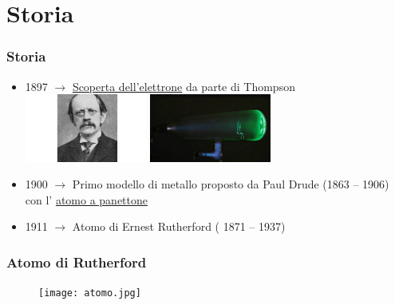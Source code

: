\section{Storia} %
	\label{sec:storia}
	
	\begin{frame}[t]\frametitle{Storia}
		\begin{itemize}
			\item 1897 $\longrightarrow$ \href{http://www.wired.it/scienza/energia/2014/04/30/la-scoperta-dellelettrone/}{Scoperta dell'elettrone} da parte di Thompson 
			\includegraphics[width=4cm]{./img/thompson.jpg}
			\includegraphics[width=4cm]{./img/tubo.jpg}
			\pause
			\item 1900  $\longrightarrow$ Primo modello di metallo proposto da Paul Drude (1863 – 1906) con l' \href{http://www.dmf.unicatt.it/~sangalet/PLS/Buone_pratiche/Esperimento_Rutherford.pdf}{atomo a panettone}
			\pause
			\item 1911  $\longrightarrow$ Atomo di Ernest Rutherford ( 1871 – 1937)
		\end{itemize}
	\end{frame}

	\begin{frame}[c]\frametitle{Atomo di Rutherford}
	    
		\begin{figure}[tb]
			\centering
			\texttt{[image: atomo.jpg]}
			\label{fig:atomo_di_Rutherford}
		\end{figure}

	\end{frame}

